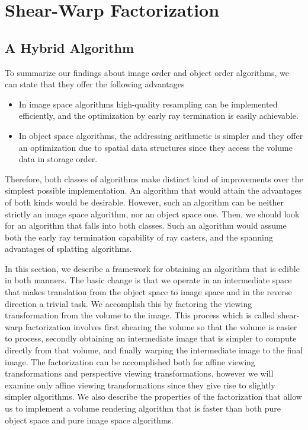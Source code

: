 \documentclass[a4paper,12pt]{article}
\begin{document}
\newpage


\section{Shear-Warp Factorization}

\subsection{A Hybrid Algorithm}

To summarize our findings about image order and object order
algorithms, we can state that they offer the following advantages
\begin{itemize}
\item In image space algorithms high-quality resampling can be
  implemented efficiently, and the optimization by early ray
  termination is easily achievable.
\item In object space algorithms, the addressing arithmetic is simpler
  and they offer an optimization due to spatial data structures since
  they access the volume data in storage order.
\end{itemize}

Therefore, both classes of algorithms make distinct kind of
improvements over the simplest possible implementation. An algorithm
that would attain the advantages of both kinds would be desirable.
However, such an algorithm can be neither strictly an image space
algorithm, nor an object space one. Then, we should look for an
algorithm that falls into both classes. Such an algorithm would assume
both the early ray termination capability of ray casters, and the
spanning advantages of splatting algorithms.

In this section, we describe a framework for obtaining an algorithm
that is edible in both manners. The basic change is that we operate in
an intermediate space that makes translation from the object space to
image space and in the reverse direction a trivial task. We accomplish 
this by factoring the viewing transformation from the volume to the
image. This process which is called shear-warp factorization involves first
shearing the volume so that the volume is easier to process,
secondly obtaining an intermediate image that is simpler to compute
directly from that volume, and finally warping the intermediate image
to the final image. The factorization can be accomplished both for
affine viewing transformations and perspective viewing
transformations, however we will examine only affine viewing
transformations since they give rise to slightly simpler algorithms.
We also describe the properties of the factorization that allow us to
implement a volume rendering algorithm that is faster than both pure
object space and pure image space algorithms.
\end{document}
